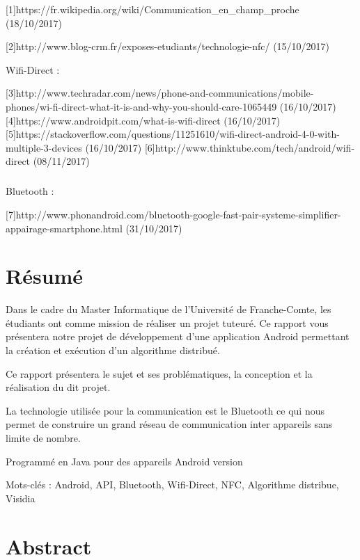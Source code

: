 \documentclass[a4paper,10pt]{report}
\begin{document}
 [1]https://fr.wikipedia.org/wiki/Communication_en_champ_proche
 (18/10/2017)
 
 [2]http://www.blog-crm.fr/exposes-etudiants/technologie-nfc/
 (15/10/2017)
 
 
\newline
 Wifi-Direct :

 [3]http://www.techradar.com/news/phone-and-communications/mobile-phones/wi-fi-direct-what-it-is-and-why-you-should-care-1065449 (16/10/2017)
 [4]https://www.androidpit.com/what-is-wifi-direct (16/10/2017)
 [5]https://stackoverflow.com/questions/11251610/wifi-direct-android-4-0-with-multiple-3-devices (16/10/2017)
 [6]http://www.thinktube.com/tech/android/wifi-direct (08/11/2017)
 
 \paragraph{}
 Bluetooth :

 [7]http://www.phonandroid.com/bluetooth-google-fast-pair-systeme-simplifier-appairage-smartphone.html (31/10/2017)
 
 \chapter*{Résumé}
 Dans le cadre du Master Informatique de l'Université de Franche-Comte, les étudiants ont comme mission de réaliser un projet tuteuré. Ce rapport vous présentera notre projet de développement d'une application Android permettant la création et exécution d'un algorithme distribué.
 
 Ce rapport présentera le sujet et ses problématiques, la conception et la réalisation du dit projet.
 
 La technologie utilisée pour la communication est le Bluetooth ce qui nous permet de construire un grand réseau de communication inter appareils sans limite de nombre.
 
 Programmé en Java  pour des appareils Android version 
 
 Mots-clés : Android, API, Bluetooth, Wifi-Direct, NFC, Algorithme distribue, Visidia
 
 \chapter*{Abstract}
\end{document}
